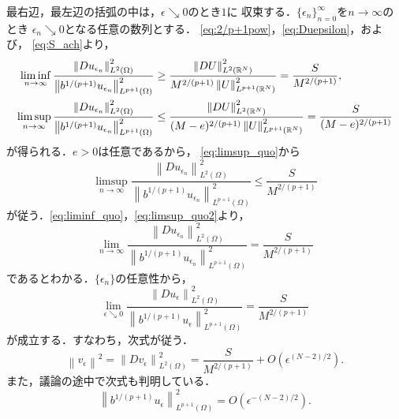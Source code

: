 最右辺，最左辺の括弧の中は，$\epsilon \searrow 0$のとき$1$に
収束する．$\{ \epsilon_n \}_{n=0}^\infty$を$n \to \infty$のとき
$\epsilon_n \searrow 0$となる任意の数列とする．
\eqref{eq:2/p+1pow}，\eqref{eq:Duepsilon}，および，
\eqref{eq:S_ach}より，
\begin{align}
 \liminf_{n \to \infty} \frac{\left\| Du_{\epsilon_n}
 \right\|_{L^2(\Omega)}^2}{\left\| b^{1/(p+1)} u_{\epsilon_n}
 \right\|_{L^{p+1}(\Omega)}^2} &\geq 
 \frac{\left\| DU \right\|_{L^2(\mathbb{R}^N)}^2}
   {M^{2/(p+1)} \left\| U \right\|_{L^{p+1}(\mathbb{R}^N)}^2} 
 = \frac{S}{M^{2/(p+1)}}, \label{eq:liminf_quo} \\ 
 \limsup_{n \to \infty} \frac{\left\| Du_{\epsilon_n}
 \right\|_{L^2(\Omega)}^2}{\left\| b^{1/(p+1)} u_{\epsilon_n}
 \right\|_{L^{p+1}(\Omega)}^2} &\leq 
 \frac{\left\| DU \right\|_{L^2(\mathbb{R}^N)}^2}
   {(M-e)^{2/(p+1)} \left\| U \right\|_{L^{p+1}(\mathbb{R}^N)}^2} 
 = \frac{S}{(M-e)^{2/(p+1)}} \label{eq:limsup_quo}
\end{align}
が得られる．$e > 0$は任意であるから，
\eqref{eq:limsup_quo}から
\begin{equation}
 \limsup_{n \to \infty} \frac{\left\| Du_{\epsilon_n}
 \right\|_{L^2(\Omega)}^2}{\left\| b^{1/(p+1)} u_{\epsilon_n}
 \right\|_{L^{p+1}(\Omega)}^2} \leq 
 \frac{S}{M^{2/(p+1)}} \label{eq:limsup_quo2}
\end{equation}
が従う．\eqref{eq:liminf_quo}，\eqref{eq:limsup_quo2}より，
\[
 \lim_{n \to \infty} \frac{\left\| Du_{\epsilon_n}
 \right\|_{L^2(\Omega)}^2}{\left\| b^{1/(p+1)} u_{\epsilon_n}
 \right\|_{L^{p+1}(\Omega)}^2} =
 \frac{S}{M^{2/(p+1)}}
\]
であるとわかる．$\{ \epsilon_n \}$の任意性から，
\[
 \lim_{\epsilon \searrow 0} \frac{\left\| Du_{\epsilon}
 \right\|_{L^2(\Omega)}^2}{\left\| b^{1/(p+1)} u_{\epsilon}
 \right\|_{L^{p+1}(\Omega)}^2} =
 \frac{S}{M^{2/(p+1)}}
\]
が成立する．すなわち，次式が従う．
\begin{equation}
 \left\| v_\epsilon \right\|^2 = \left\| Dv_\epsilon
                                 \right\|^2_{L^2(\Omega)} 
 = \frac{S}{M^{2/(p+1)}} + O(\epsilon^{(N-2)/2}). \label{eq:vepsilon}
\end{equation}
また，議論の途中で次式も判明している．
\begin{equation}
 \left\| b^{1/(p+1)} u_\epsilon \right\|_{L^{p+1}(\Omega)}^2 = 
 O(\epsilon^{-(N-2)/2}). \label{eq:buepsilon}
\end{equation}

